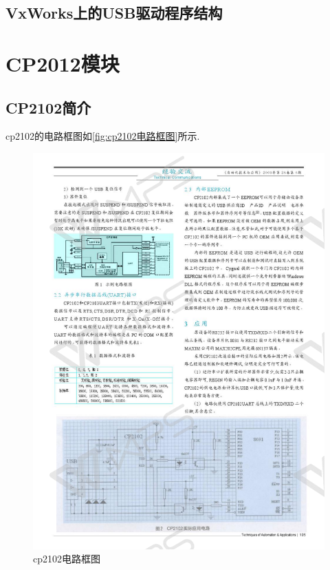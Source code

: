\subsection{VxWorks上的USB驱动程序结构}

\section{CP2012模块}
\subsection{CP2102简介}

cp2102的电路框图如\autoref{fig:cp2102电路框图}所示.

\begin{figure}[!h]
\centering
\includegraphics[width=.4\textwidth]{./graphics/cp2102-circuit-diagram.pdf}
\caption{cp2102电路框图}\label{fig:cp2102电路框图}
\end{figure}



